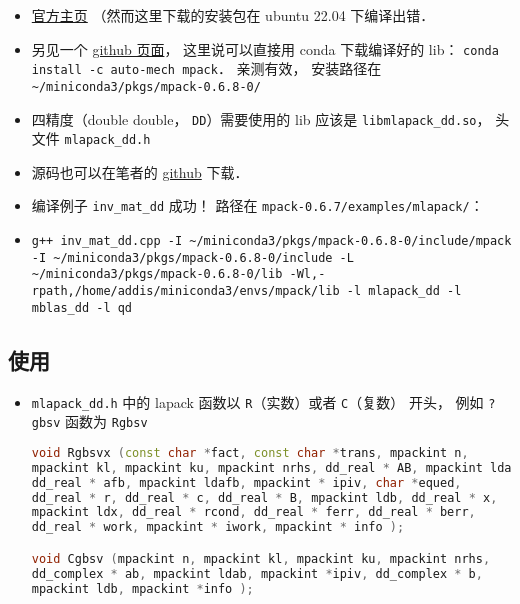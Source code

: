 
\begin{issues}
\issueDraft
\end{issues}

\begin{itemize}
\item \href{https://mplapack.sourceforge.net/}{官方主页} （然而这里下载的安装包在 ubuntu 22.04 下编译出错．
\item 另见一个 \href{https://github.com/Auto-Mech/MPACK}{github 页面}， 这里说可以直接用 conda 下载编译好的 lib： \verb|conda install -c auto-mech mpack|． 亲测有效， 安装路径在 \verb|~/miniconda3/pkgs/mpack-0.6.8-0/|
\item 四精度（double double， \verb|DD|）需要使用的 lib 应该是 \verb|libmlapack_dd.so|， 头文件 \verb|mlapack_dd.h|
\item 源码也可以在笔者的 \href{https://github.com/MacroUniverse/MPACK-source}{github} 下载．
\item 编译例子 \verb|inv_mat_dd| 成功！ 路径在 \verb|mpack-0.6.7/examples/mlapack/|：
\item \verb|g++ inv_mat_dd.cpp -I ~/miniconda3/pkgs/mpack-0.6.8-0/include/mpack -I ~/miniconda3/pkgs/mpack-0.6.8-0/include -L ~/miniconda3/pkgs/mpack-0.6.8-0/lib -Wl,-rpath,/home/addis/miniconda3/envs/mpack/lib -l mlapack_dd -l mblas_dd -l qd|
\end{itemize}

\subsection{使用}
\begin{itemize}
\item \verb|mlapack_dd.h| 中的 lapack 函数以 \verb|R|（实数）或者 \verb|C|（复数） 开头， 例如 \verb|?gbsv| 函数为 \verb|Rgbsv|
\begin{lstlisting}[language=cpp]
void Rgbsvx (const char *fact, const char *trans, mpackint n,
mpackint kl, mpackint ku, mpackint nrhs, dd_real * AB, mpackint ldab,
dd_real * afb, mpackint ldafb, mpackint * ipiv, char *equed,
dd_real * r, dd_real * c, dd_real * B, mpackint ldb, dd_real * x,
mpackint ldx, dd_real * rcond, dd_real * ferr, dd_real * berr,
dd_real * work, mpackint * iwork, mpackint * info );

void Cgbsv (mpackint n, mpackint kl, mpackint ku, mpackint nrhs,
dd_complex * ab, mpackint ldab, mpackint *ipiv, dd_complex * b,
mpackint ldb, mpackint *info );
\end{lstlisting}
\end{itemize}
